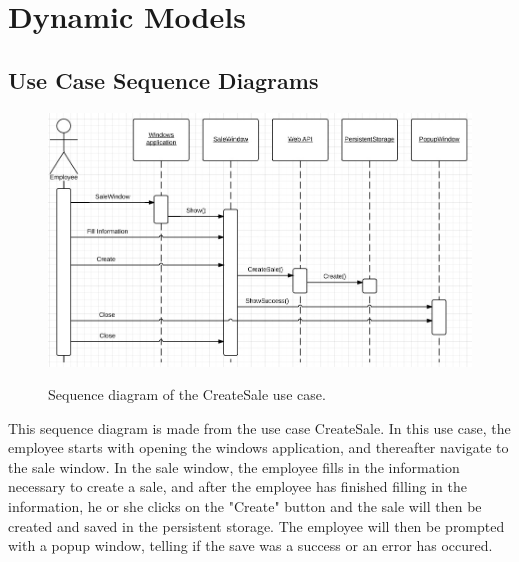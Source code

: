 \section{Dynamic Models}

\subsection{Use Case Sequence Diagrams}
\begin{figure}[H]
	\centering
		\includegraphics[width=\textwidth]{Figures/SequenceDiagram-CreateSale}\\
	\caption{Sequence diagram of the CreateSale use case.}
  \label{fig:SequenceDiagram-CreateSale}
\end{figure}

This sequence diagram is made from the use case CreateSale. 
In this use case, the employee starts with opening the windows application, and thereafter navigate to the sale window. In the sale window, the employee fills in the information necessary to create a sale, and after the employee has finished filling in the information, he or she clicks on the "Create" button and the sale will then be created and saved in the persistent storage. The employee will then be prompted with a popup window, telling if the save was a success or an error has occured.

